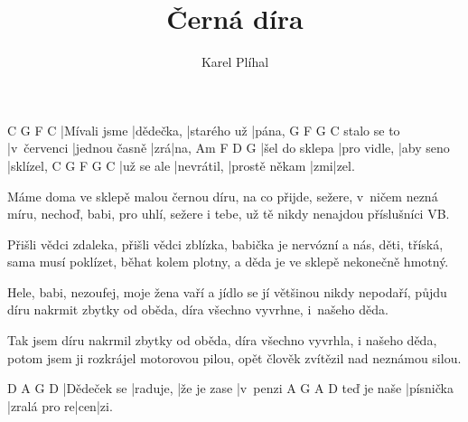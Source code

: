 \documentclass{song}
\author{Karel Plíhal}
\title{Černá díra}
\begin{document}
\strophe
C			 G		   F		   C
|Mívali jsme |dědečka, |starého už |pána,
			G			F			  G   C
stalo se to |v~červenci |jednou časně |zrá|na,
Am			   F		   D		 G
|šel do sklepa |pro vidle, |aby seno |sklízel,
C		   G		  F				G	C
|už se ale |nevrátil, |prostě někam |zmi|zel.
\endstrophe

\strophe*
Máme doma ve sklepě malou černou díru,
na co přijde, sežere, v~ničem nezná míru,
nechoď, babi, pro uhlí, sežere i tebe,
už tě nikdy nenajdou příslušníci VB.
\endstrophe

\strophe*
Přišli vědci zdaleka, přišli vědci zblízka,
babička je nervózní a nás, děti, tříská,
sama musí poklízet, běhat kolem plotny,
a děda je ve sklepě nekonečně hmotný.
\endstrophe

\strophe*
Hele, babi, nezoufej, moje žena vaří
a jídlo se jí většinou nikdy nepodaří,
půjdu díru nakrmit zbytky od oběda,
díra všechno vyvrhne, i~našeho děda.
\endstrophe

\strophe*
Tak jsem díru nakrmil zbytky od oběda,
díra všechno vyvrhla, i našeho děda,
potom jsem ji rozkrájel motorovou pilou,
opět člověk zvítězil nad neznámou silou.
\endstrophe

\strophe
D			A		 G			 D   
|Dědeček se |raduje, |že je zase |v~penzi
			A		  G			   A   D
teď je naše |písnička |zralá pro re|cen|zi.
\endstrophe
\end{document}
